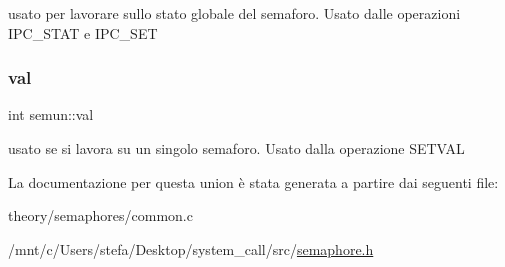 usato per lavorare sullo stato globale del semaforo. Usato dalle operazioni I\+P\+C\+\_\+\+S\+T\+AT e I\+P\+C\+\_\+\+S\+ET \mbox{\label{unionsemun_ac6121ecb6d04a024e07e12bd71b94031}} 
\subsubsection{\texorpdfstring{val}{val}}
{\footnotesize\ttfamily int semun\+::val}

usato se si lavora su un singolo semaforo. Usato dalla operazione S\+E\+T\+V\+AL 

La documentazione per questa union è stata generata a partire dai seguenti file\+:\begin{DoxyCompactItemize}
\item 
theory/semaphores/common.\+c\item 
/mnt/c/\+Users/stefa/\+Desktop/system\+\_\+call/src/\hyperlink{semaphore_8h}{semaphore.\+h}\end{DoxyCompactItemize}
